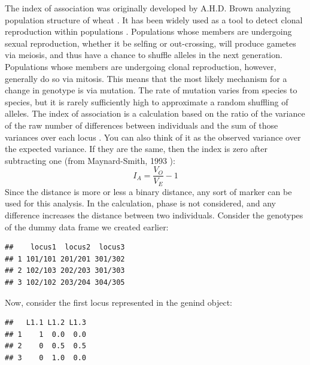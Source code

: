 \documentclass[letterpaper]{article}\usepackage[]{graphicx}\usepackage[]{color}
\makeatletter
\newenvironment{kframe}{%
 \def\at@end@of@kframe{}%
 \ifinner\ifhmode%
  \def\at@end@of@kframe{\end{minipage}}%
  \begin{minipage}{\columnwidth}%
 \fi\fi%
 \def\FrameCommand##1{\hskip\@totalleftmargin \hskip-\fboxsep
 \colorbox{shadecolor}{##1}\hskip-\fboxsep
     \hskip-\linewidth \hskip-\@totalleftmargin \hskip\columnwidth}%
 \MakeFramed {\advance\hsize-\width
   \@totalleftmargin\z@ \linewidth\hsize
   \@setminipage}}%
 {\par\unskip\endMakeFramed%
 \at@end@of@kframe}
\newenvironment{knitrout}{}{} %
\newcommand{\tab}{\hspace*{1em}}
\makeatother
\begin{document}
\tab \tab The index of association was originally developed by A.H.D. Brown analyzing population structure of wheat \cite{Brown:1980}. It has been widely used as a tool to detect clonal reproduction within populations \cite{Smith:1993}. Populations whose members are undergoing sexual reproduction, whether it be selfing or out-crossing, will produce gametes via meiosis, and thus have a chance to shuffle alleles in the next generation. Populations whose members are undergoing clonal reproduction, however, generally do so via mitosis. This means that the most likely mechanism for a change in genotype is via mutation. The rate of mutation varies from species to species, but it is rarely sufficiently high to approximate a random shuffling of alleles. The index of association is a calculation based on the ratio of the variance of the raw number of differences between individuals and the sum of those variances over each locus \cite{Smith:1993}. You can also think of it as the observed variance over the expected variance. If they  are the same, then the index is zero after subtracting one (from Maynard-Smith, 1993 \cite{Smith:1993}):
\begin{equation}
\label{eq:I_A}
I_A = \frac{V_O}{V_E}-1
\end{equation}
Since the distance is more or less a binary distance, any sort of marker can be used for this analysis. In the calculation, phase is not considered, and any difference increases the distance between two individuals. Consider the genotypes of the dummy data frame we created earlier:
\begin{knitrout}\footnotesize
{}\color{fgcolor}\begin{kframe}
\begin{verbatim}
##    locus1  locus2  locus3
## 1 101/101 201/201 301/302
## 2 102/103 202/203 301/303
## 3 102/102 203/204 304/305
\end{verbatim}
\end{kframe}
\end{knitrout}

Now, consider the first locus represented in the genind object:
\begin{knitrout}\footnotesize
{}\color{fgcolor}\begin{kframe}
\begin{verbatim}
##   L1.1 L1.2 L1.3
## 1    1  0.0  0.0
## 2    0  0.5  0.5
## 3    0  1.0  0.0
\end{verbatim}
\end{kframe}
\end{knitrout}
\end{document}
